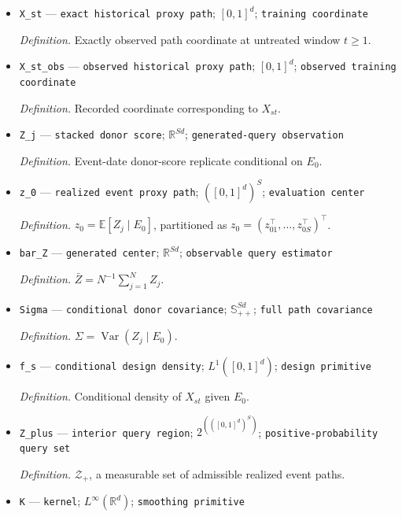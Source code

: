 \documentclass{article}
\begin{document}
\begin{itemize}
  \item \texttt{X\_\allowbreak{}st} --- \texttt{exact historical proxy path}; \([0,1]^d\); \texttt{training coordinate}
  \par\smallskip\noindent\emph{Definition.} Exactly observed path coordinate at untreated window \(t\ge1\).
  \item \texttt{X\_\allowbreak{}st\_\allowbreak{}obs} --- \texttt{observed historical proxy path}; \([0,1]^d\); \texttt{observed training coordinate}
  \par\smallskip\noindent\emph{Definition.} Recorded coordinate corresponding to \(X_{st}\).
  \item \texttt{Z\_\allowbreak{}j} --- \texttt{stacked donor score}; \(\mathbb R^{Sd}\); \texttt{generated-\allowbreak{}query observation}
  \par\smallskip\noindent\emph{Definition.} Event-date donor-score replicate conditional on \(E_0\).
  \item \texttt{z\_\allowbreak{}0} --- \texttt{realized event proxy path}; \(([0,1]^d)^S\); \texttt{evaluation center}
  \par\smallskip\noindent\emph{Definition.} \(z_0=\mathbb E[Z_j\mid E_0]\), partitioned as \(z_0=(z_{01}^{\top},\ldots,z_{0S}^{\top})^{\top}\).
  \item \texttt{bar\_\allowbreak{}Z} --- \texttt{generated center}; \(\mathbb R^{Sd}\); \texttt{observable query estimator}
  \par\smallskip\noindent\emph{Definition.} \(\bar Z=N^{-1}\sum_{j=1}^{N}Z_j\).
  \item \texttt{Sigma} --- \texttt{conditional donor covariance}; \(\mathbb S_{++}^{Sd}\); \texttt{full path covariance}
  \par\smallskip\noindent\emph{Definition.} \(\Sigma=\operatorname{Var}(Z_j\mid E_0)\).
  \item \texttt{f\_\allowbreak{}s} --- \texttt{conditional design density}; \(L^1([0,1]^d)\); \texttt{design primitive}
  \par\smallskip\noindent\emph{Definition.} Conditional density of \(X_{st}\) given \(E_0\).
  \item \texttt{Z\_\allowbreak{}plus} --- \texttt{interior query region}; \(2^{(([0,1]^d)^S)}\); \texttt{positive-\allowbreak{}probability query set}
  \par\smallskip\noindent\emph{Definition.} \(\mathcal Z_+\), a measurable set of admissible realized event paths.
  \item \texttt{K} --- \texttt{kernel}; \(L^\infty(\mathbb R^d)\); \texttt{smoothing primitive}

\end{itemize}
\end{document}
